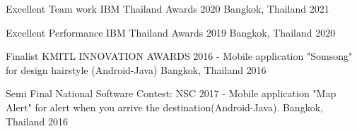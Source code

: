 


\begin{cvhonors}


  \cvhonor
  {Excellent Team work} %
  {IBM Thailand Awards 2020} %
  {Bangkok, Thailand} %
  {2021} %


  \cvhonor
    {Excellent Performance} %
    {IBM Thailand Awards 2019} %
    {Bangkok, Thailand} %
    {2020} %


  \cvhonor
    {Finalist} %
    {KMITL INNOVATION AWARDS 2016 - Mobile application "Somsong" for design hairstyle (Android-Java)} %
    {Bangkok, Thailand} %
    {2016} %


  \cvhonor
  {Semi Final} %
  {National Software Contest: NSC 2017 - Mobile application "Map Alert" for alert when you arrive the destination(Android-Java).} %
  {Bangkok, Thailand} %
  {2016} %

\end{cvhonors}
